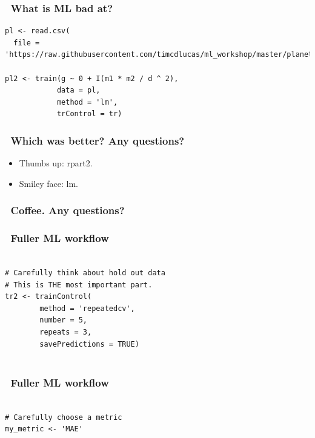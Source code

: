 \documentclass[handout, aspectratio = 169]{beamer}
\begin{document}
\begin{frame}[fragile]
\frametitle{\insertframenumber~What is ML bad at?}
\renewcommand{\FancyVerbFormatLine}[1]{%
   \ifnum\value{FancyVerbLine}=1\color{cyan}#1%
   \else #1\fi}
\begin{Verbatim}
pl <- read.csv(
  file = 'https://raw.githubusercontent.com/timcdlucas/ml_workshop/master/planets.csv')

pl2 <- train(g ~ 0 + I(m1 * m2 / d ^ 2), 
            data = pl,
            method = 'lm',
            trControl = tr)

\end{Verbatim}

\end{frame} 



\begin{frame}
\frametitle{\insertframenumber~Which was better? Any questions?}

\begin{itemize}
\item Thumbs up: rpart2.
\item Smiley face: lm.
\end{itemize}
\end{frame} 









\begin{frame}
\frametitle{\insertframenumber~Coffee. Any questions?}


\end{frame} 











\begin{frame}[fragile]
\frametitle{\insertframenumber~Fuller ML workflow}
\begin{Verbatim}

# Carefully think about hold out data
# This is THE most important part.
tr2 <- trainControl(
        method = 'repeatedcv',
        number = 5,
        repeats = 3, 
        savePredictions = TRUE)


\end{Verbatim}

\end{frame} 


\begin{frame}[fragile]
\frametitle{\insertframenumber~Fuller ML workflow}
\begin{Verbatim}

# Carefully choose a metric
my_metric <- 'MAE'

\end{Verbatim}

\end{frame} 
\end{document}
